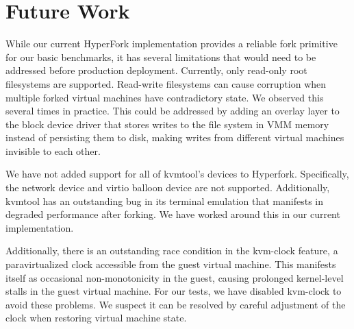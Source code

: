 \section{Future Work} \label{sec:future}

 While our current HyperFork implementation
provides a reliable fork primitive for our basic benchmarks, it has several
limitations that would need to be addressed before production deployment.
Currently, only read-only root filesystems are supported. Read-write
filesystems can cause corruption when multiple forked virtual machines have
contradictory state. We observed this several times in practice. This could be
addressed by adding an overlay layer to the block device driver that stores
writes to the file system in VMM memory instead of persisting them to disk,
making writes from different virtual machines invisible to each other.

We have not added support for all of kvmtool's devices to Hyperfork.
Specifically, the network device and virtio balloon device are not
supported. Additionally, kvmtool has an outstanding bug in its terminal
emulation that manifests in degraded performance after forking. We have worked
around this in our current implementation.

Additionally, there is an outstanding race condition in the kvm-clock feature,
a paravirtualized clock accessible from the guest virtual machine. This
manifests itself as occasional non-monotonicity in the guest, causing prolonged
kernel-level stalls in the guest virtual machine. For our tests, we have
disabled kvm-clock to avoid these problems. We suspect it can be resolved by
careful adjustment of the clock when restoring virtual machine state.


